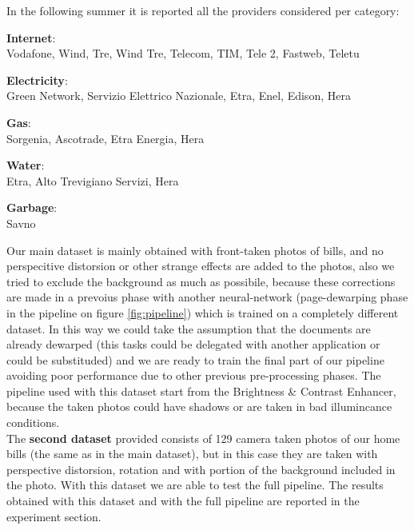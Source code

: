 \documentclass[10pt,twocolumn,letterpaper]{article}
\begin{document}
In the following summer it is reported all the providers considered per category:\\

\begin{itemize}
\end{itemize}

Our main dataset is mainly obtained with front-taken photos of bills, and no perspecitive distorsion or other strange effects are added to the photos, also we tried to exclude the background as much as possibile, because these corrections are made in a prevoius phase with another neural-network (page-dewarping phase in the pipeline on figure \ref{fig:pipeline}) which is trained on a completely different dataset. In this way we could take the assumption that the documents are already dewarped (this tasks could be delegated with another application or could be substituded) and we are ready to train the final part of our pipeline avoiding poor performance due to other previous pre-processing phases. The pipeline used with this dataset start from the Brightness \& Contrast Enhancer, because the taken photos could have shadows or are taken in bad illumincance conditions. \\

The \textbf{second dataset} provided consists of 129 camera taken photos of our home bills (the same as in the main dataset), but in this case they are taken with perspective distorsion, rotation and with portion of the background included in the photo. With this dataset we are able to test the full pipeline. The results obtained with this dataset and with the full pipeline are reported in the experiment section. \\
\end{document}
